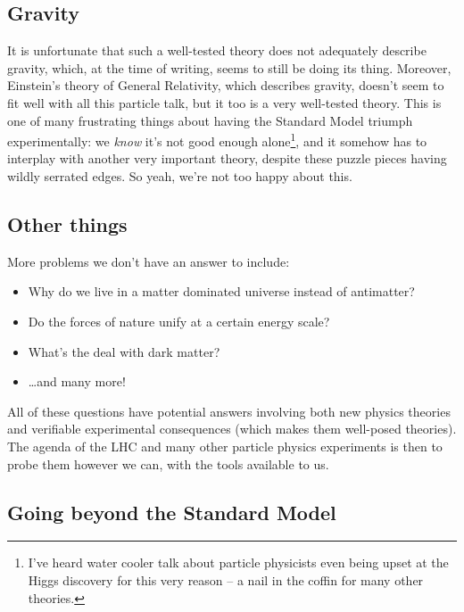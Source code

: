 \documentclass[
  11pt,
  numbers=noendperiod]{book}
\providecommand{\tightlist}{%
  \setlength{\itemsep}{0pt}\setlength{\parskip}{0pt}}\usepackage{longtable,booktabs,array}
\begin{document}
\hypertarget{gravity}{%
\subsection{Gravity}\label{gravity}}

It is unfortunate that such a well-tested theory does not adequately
describe gravity, which, at the time of writing, seems to still be doing
its thing. Moreover, Einstein's theory of General Relativity, which
describes gravity, doesn't seem to fit well with all this particle talk,
but it too is a very well-tested theory. This is one of many frustrating
things about having the Standard Model triumph experimentally: we
\emph{know} it's not good enough alone\footnote{I've heard water cooler
  talk about particle physicists even being upset at the Higgs discovery
  for this very reason -- a nail in the coffin for many other theories.},
and it somehow has to interplay with another very important theory,
despite these puzzle pieces having wildly serrated edges. So yeah, we're
not too happy about this.

\hypertarget{other-things}{%
\subsection{Other things}\label{other-things}}

More problems we don't have an answer to include:

\begin{itemize}
\tightlist
\item
  Why do we live in a matter dominated universe instead of antimatter?
\item
  Do the forces of nature unify at a certain energy scale?
\item
  What's the deal with dark matter?
\item
  \ldots and many more!
\end{itemize}

All of these questions have potential answers involving both new physics
theories and verifiable experimental consequences (which makes them
well-posed theories). The agenda of the LHC and many other particle
physics experiments is then to probe them however we can, with the tools
available to us.

\hypertarget{going-beyond-the-standard-model}{%
\subsection{Going beyond the Standard
Model}\label{going-beyond-the-standard-model}}
\end{document}
